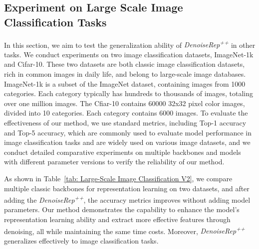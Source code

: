 \documentclass[conference]{IEEEtran}
\begin{document}
{\subsection{Experiment on Large Scale Image Classification Tasks} 
\label{sec: Experiment on Large Scale Image Classification Task}
In this section, we aim to test the generalization ability of \textit{DenoiseRep\textsuperscript{++}} in other tasks. We conduct experiments on two image classification datasets, ImageNet-1k and Cifar-10. These two datasets are both classic image classification datasets, rich in common images in daily life, and belong to large-scale image databases. ImageNet-1k is a subset of the ImageNet dataset, containing images from 1000 categories. Each category typically has hundreds to thousands of images, totaling over one million images. The Cfiar-10 contains 60000 32x32 pixel color images, divided into 10 categories. Each category contains 6000 images. To evaluate the effectiveness of our method, we use standard metrics, including Top-1 accuracy and Top-5 accuracy, which are commonly used to evaluate model performance in image classification tasks and are widely used on various image datasets, and we conduct detailed comparative experiments on multiple backbones and models with different parameter versions to verify the reliability of our method. 

As shown in Table~\ref{tab: Large-Scale Image Classification V2}, we compare multiple classic backbones for representation learning on two datasets, and after adding the \textit{DenoiseRep\textsuperscript{++}}, the accuracy metrics improves without adding model parameters. Our method demonstrates the capability to enhance the model's representation learning ability and extract more effective features through denoising, all while maintaining the same time costs. Moreover, \textit{DenoiseRep\textsuperscript{++}} generalizes effectively to image classification tasks.


}
\end{document}
